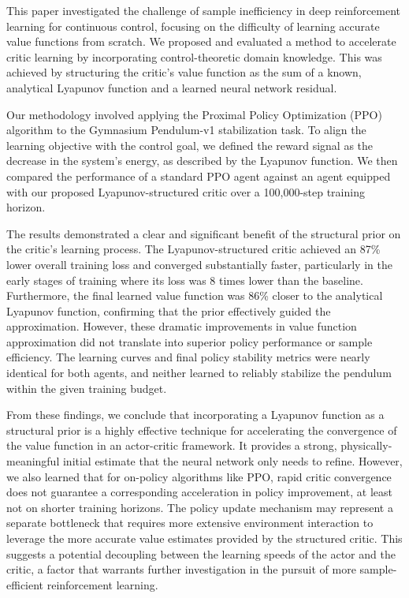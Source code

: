 \documentclass[]{article}
\begin{document}
This paper investigated the challenge of sample inefficiency in deep reinforcement learning for continuous control, focusing on the difficulty of learning accurate value functions from scratch. We proposed and evaluated a method to accelerate critic learning by incorporating control-theoretic domain knowledge. This was achieved by structuring the critic's value function as the sum of a known, analytical Lyapunov function and a learned neural network residual.

Our methodology involved applying the Proximal Policy Optimization (PPO) algorithm to the Gymnasium Pendulum-v1 stabilization task. To align the learning objective with the control goal, we defined the reward signal as the decrease in the system's energy, as described by the Lyapunov function. We then compared the performance of a standard PPO agent against an agent equipped with our proposed Lyapunov-structured critic over a 100,000-step training horizon.

The results demonstrated a clear and significant benefit of the structural prior on the critic's learning process. The Lyapunov-structured critic achieved an 87\% lower overall training loss and converged substantially faster, particularly in the early stages of training where its loss was 8 times lower than the baseline. Furthermore, the final learned value function was 86\% closer to the analytical Lyapunov function, confirming that the prior effectively guided the approximation. However, these dramatic improvements in value function approximation did not translate into superior policy performance or sample efficiency. The learning curves and final policy stability metrics were nearly identical for both agents, and neither learned to reliably stabilize the pendulum within the given training budget.

From these findings, we conclude that incorporating a Lyapunov function as a structural prior is a highly effective technique for accelerating the convergence of the value function in an actor-critic framework. It provides a strong, physically-meaningful initial estimate that the neural network only needs to refine. However, we also learned that for on-policy algorithms like PPO, rapid critic convergence does not guarantee a corresponding acceleration in policy improvement, at least not on shorter training horizons. The policy update mechanism may represent a separate bottleneck that requires more extensive environment interaction to leverage the more accurate value estimates provided by the structured critic. This suggests a potential decoupling between the learning speeds of the actor and the critic, a factor that warrants further investigation in the pursuit of more sample-efficient reinforcement learning.
\end{document}
